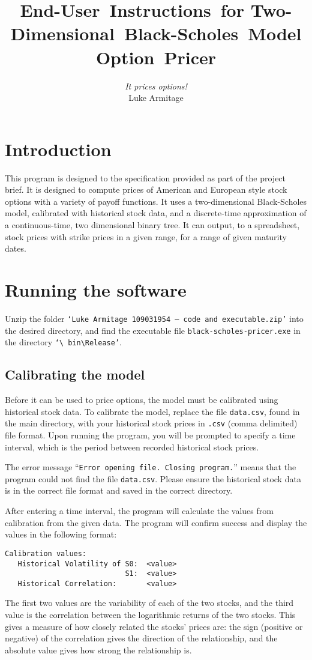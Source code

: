 \documentclass[12pt,a4paper]{article}
\author{\textit{It prices options!} 
		\\ Luke Armitage}
\date{}
\title{{\bfseries End-User~Instructions}~for Two-Dimensional~Black-Scholes~Model 
Option~Pricer}
\begin{document}
\maketitle

\section{Introduction}
This program is designed to the specification provided as part of the project 
brief. It is designed to compute prices of American and European style stock 
options with a variety of payoff functions. It uses a two-dimensional 
Black-Scholes model, calibrated with historical stock data, and a discrete-time 
approximation of a continuous-time, two dimensional binary tree. It can output, 
to a spreadsheet, stock prices with strike prices in a given range, for a range 
of given maturity dates. 




\section{Running the software}
Unzip the folder \texttt{`Luke Armitage 109031954 -- code and executable.zip'} 
into the desired directory, and find the executable file 
\texttt{black-scholes-pricer.exe} in the directory \texttt{`\textbackslash 
bin\textbackslash Release'}.


\subsection{Calibrating the model}
Before it can be used to price options, the model must be calibrated using 
historical stock data. 
To calibrate the model, replace the file \texttt{data.csv}, found in the main 
directory, with your historical stock prices in \texttt{.csv} (comma delimited) 
file format. Upon running the program, you will be prompted to specify a time 
interval, which is the period between recorded historical stock prices. 

The error message ``\texttt{Error opening file. Closing program.}'' means that 
the program could not find the file \texttt{data.csv}. Please ensure the 
historical stock data is in the correct file format and saved in the correct 
directory.

After entering a time interval, the program will calculate the values from 
calibration from the given data. The program will confirm success and display 
the values in the following format:
\begin{lstlisting}
Calibration values:
   Historical Volatility of S0:  <value>
                            S1:  <value>
   Historical Correlation:       <value>
\end{lstlisting}
The first two values are the variability of each of the two stocks, and the 
third value is the correlation between the logarithmic returns of the two 
stocks. This gives a measure of how closely related the stocks' prices are: the 
sign (positive or negative) of the correlation gives the direction of the 
relationship, and the absolute value gives how strong the relationship is.
\end{document}

